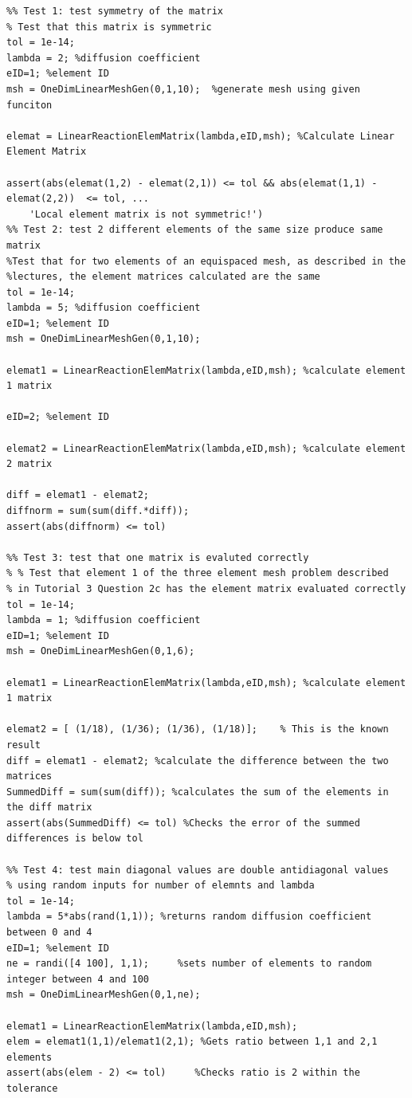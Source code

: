 \documentclass[11pt]{article}
\begin{document}
\begin{appendices}
\begin{lstlisting}
%% Test 1: test symmetry of the matrix
% Test that this matrix is symmetric
tol = 1e-14;
lambda = 2; %diffusion coefficient
eID=1; %element ID
msh = OneDimLinearMeshGen(0,1,10);  %generate mesh using given funciton

elemat = LinearReactionElemMatrix(lambda,eID,msh); %Calculate Linear Element Matrix

assert(abs(elemat(1,2) - elemat(2,1)) <= tol && abs(elemat(1,1) - elemat(2,2))  <= tol, ...
    'Local element matrix is not symmetric!')
%% Test 2: test 2 different elements of the same size produce same matrix
%Test that for two elements of an equispaced mesh, as described in the
%lectures, the element matrices calculated are the same
tol = 1e-14;
lambda = 5; %diffusion coefficient
eID=1; %element ID
msh = OneDimLinearMeshGen(0,1,10);

elemat1 = LinearReactionElemMatrix(lambda,eID,msh);	%calculate element 1 matrix

eID=2; %element ID

elemat2 = LinearReactionElemMatrix(lambda,eID,msh); %calculate element 2 matrix

diff = elemat1 - elemat2;
diffnorm = sum(sum(diff.*diff));
assert(abs(diffnorm) <= tol)

%% Test 3: test that one matrix is evaluted correctly
% % Test that element 1 of the three element mesh problem described 
% in Tutorial 3 Question 2c has the element matrix evaluated correctly
tol = 1e-14;
lambda = 1; %diffusion coefficient
eID=1; %element ID
msh = OneDimLinearMeshGen(0,1,6);

elemat1 = LinearReactionElemMatrix(lambda,eID,msh); %calculate element 1 matrix

elemat2 = [ (1/18), (1/36); (1/36), (1/18)];    % This is the known result
diff = elemat1 - elemat2; %calculate the difference between the two matrices
SummedDiff = sum(sum(diff)); %calculates the sum of the elements in the diff matrix
assert(abs(SummedDiff) <= tol) %Checks the error of the summed differences is below tol

%% Test 4: test main diagonal values are double antidiagonal values
% using random inputs for number of elemnts and lambda
tol = 1e-14;
lambda = 5*abs(rand(1,1)); %returns random diffusion coefficient between 0 and 4
eID=1; %element ID
ne = randi([4 100], 1,1);     %sets number of elements to random integer between 4 and 100
msh = OneDimLinearMeshGen(0,1,ne);

elemat1 = LinearReactionElemMatrix(lambda,eID,msh);
elem = elemat1(1,1)/elemat1(2,1); %Gets ratio between 1,1 and 2,1 elements
assert(abs(elem - 2) <= tol)     %Checks ratio is 2 within the tolerance
\end{lstlisting}
\pagebreak





\end{appendices}
\end{document}
